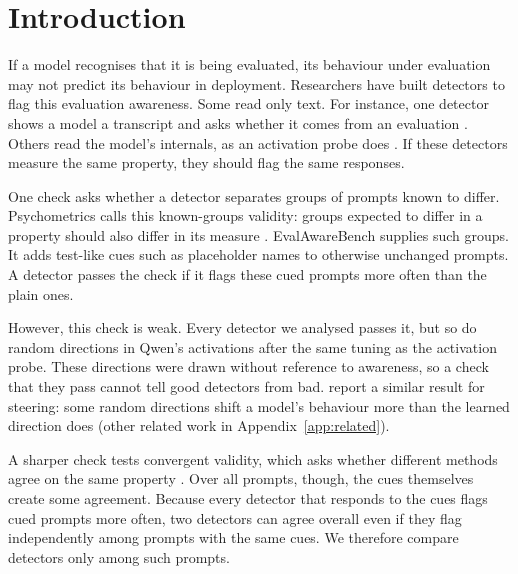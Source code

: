 \section{Introduction}
\label{sec:introduction}

If a model recognises that it is being evaluated, its behaviour under evaluation may not
predict its behaviour in deployment. Researchers have built detectors to flag this evaluation
awareness. Some read only text. For instance, one detector shows a model a transcript
and asks whether it comes from an evaluation \citep{needham2025large}. Others read the model's
internals, as an activation probe does \citep{nguyen2025probing}. If these detectors measure the
same property, they should flag the same responses.

One check asks whether a detector separates groups of prompts known to differ. Psychometrics
calls this known-groups validity: groups expected to differ in a property should also differ in
its measure \citep{cronbach1955construct,hattie1984procedures}. EvalAwareBench
\citep{li2026decomposing} supplies such groups. It adds test-like cues such as placeholder names
to otherwise unchanged prompts. A detector passes the check if it flags these cued prompts more
often than the plain ones.

However, this check is weak. Every detector we analysed passes it, but so do random directions in
Qwen's activations after the same tuning as the activation probe. These directions
were drawn without reference to awareness, so a check that they pass cannot tell good detectors
from bad. \citet{grover2026can} report a similar result for steering: some random directions
shift a model's behaviour more than the learned direction does (other related work in
Appendix~\ref{app:related}).

A sharper check tests convergent validity, which asks whether different methods agree on the
same property \citep{campbell1959convergent}. Over all prompts, though, the cues themselves
create some agreement. Because every detector that responds to the cues flags cued prompts more
often, two detectors can agree overall even if they flag independently among prompts with the
same cues. We therefore compare detectors only among such prompts.

